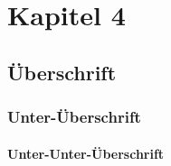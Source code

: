 \chapter{Kapitel 4}

\section{Überschrift}

\subsection{Unter-Überschrift}

\subsubsection{Unter-Unter-Überschrift}
